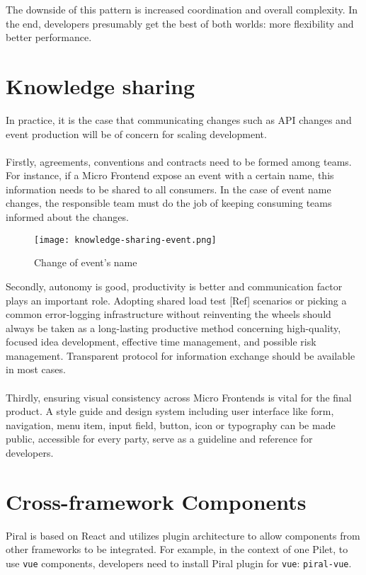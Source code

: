 \documentclass[a4paper]{book}
\begin{document}
The downside of this pattern is increased coordination and overall complexity. In the end, developers presumably get the best of both worlds: more flexibility and better performance. 
\section{Knowledge sharing }
In practice, it is the case that communicating changes such as API changes and event production will be of concern for scaling development. 
\\ \\
Firstly, agreements, conventions and contracts need to be formed among teams. For instance, if a Micro Frontend expose an event with a certain name, this information needs to be shared to all consumers. In the case of event name changes, the responsible team must do the job of keeping consuming teams informed about the changes.
\begin{figure}[h!]
    \centering
    \captionsetup{justification=centering}
    \texttt{[image: knowledge-sharing-event.png]}
    \caption{Change of event's name \cite{Rap20}}
    \label{fig:5}
\end{figure}
Secondly, autonomy is good, productivity is better and communication factor plays an important role. Adopting shared load test [Ref] scenarios or picking a common error-logging infrastructure without reinventing the wheels should always be taken as a long-lasting productive method concerning high-quality, focused idea development, effective time management, and possible risk management. Transparent protocol for information exchange should be available in most cases.
\\ \\
Thirdly, ensuring visual consistency across Micro Frontends is vital for the final product. A style guide and design system including user interface like form, navigation, menu item, input field, button, icon or typography can be made public, accessible for every party, serve as a guideline and reference for developers.

\section{Cross-framework Components}
Piral is based on React and utilizes plugin architecture to allow components from other frameworks to be integrated. For example, in the context of one Pilet, to use \verb|vue| components, developers need to install Piral plugin for \verb|vue|: \verb|piral-vue|.
\end{document}
